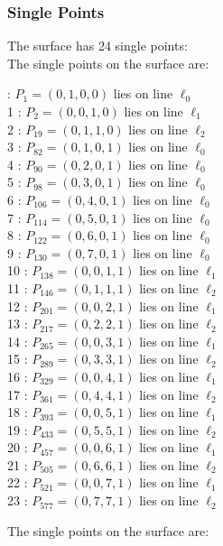 \documentclass{article}
\begin{document}
{\subsubsection*{Single Points}
The surface has 24 single points:\\
The single points on the surface are:\\
\begin{multicols}{2}
 : $P_{1}=( 0, 1, 0, 0 )$ lies on line $\ell_{0}$\\
1 : $P_{2}=( 0, 0, 1, 0 )$ lies on line $\ell_{1}$\\
2 : $P_{19}=( 0, 1, 1, 0 )$ lies on line $\ell_{2}$\\
3 : $P_{82}=( 0, 1, 0, 1 )$ lies on line $\ell_{0}$\\
4 : $P_{90}=( 0, 2, 0, 1 )$ lies on line $\ell_{0}$\\
5 : $P_{98}=( 0, 3, 0, 1 )$ lies on line $\ell_{0}$\\
6 : $P_{106}=( 0, 4, 0, 1 )$ lies on line $\ell_{0}$\\
7 : $P_{114}=( 0, 5, 0, 1 )$ lies on line $\ell_{0}$\\
8 : $P_{122}=( 0, 6, 0, 1 )$ lies on line $\ell_{0}$\\
9 : $P_{130}=( 0, 7, 0, 1 )$ lies on line $\ell_{0}$\\
10 : $P_{138}=( 0, 0, 1, 1 )$ lies on line $\ell_{1}$\\
11 : $P_{146}=( 0, 1, 1, 1 )$ lies on line $\ell_{2}$\\
12 : $P_{201}=( 0, 0, 2, 1 )$ lies on line $\ell_{1}$\\
13 : $P_{217}=( 0, 2, 2, 1 )$ lies on line $\ell_{2}$\\
14 : $P_{265}=( 0, 0, 3, 1 )$ lies on line $\ell_{1}$\\
15 : $P_{289}=( 0, 3, 3, 1 )$ lies on line $\ell_{2}$\\
16 : $P_{329}=( 0, 0, 4, 1 )$ lies on line $\ell_{1}$\\
17 : $P_{361}=( 0, 4, 4, 1 )$ lies on line $\ell_{2}$\\
18 : $P_{393}=( 0, 0, 5, 1 )$ lies on line $\ell_{1}$\\
19 : $P_{433}=( 0, 5, 5, 1 )$ lies on line $\ell_{2}$\\
20 : $P_{457}=( 0, 0, 6, 1 )$ lies on line $\ell_{1}$\\
21 : $P_{505}=( 0, 6, 6, 1 )$ lies on line $\ell_{2}$\\
22 : $P_{521}=( 0, 0, 7, 1 )$ lies on line $\ell_{1}$\\
23 : $P_{577}=( 0, 7, 7, 1 )$ lies on line $\ell_{2}$\\
\end{multicols}
The single points on the surface are:\\
}
\end{document}
